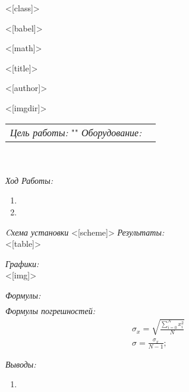
<[class]>
\usepackage[utf8]{inputenc}
<[babel]>
\usepackage[OT1]{fontenc}
<[math]>
\usepackage{graphicx}
\usepackage[left=2cm,right=2cm,top=2cm,bottom=2cm]{geometry}

<[title]>

<[author]>

<[imgdir]>

\maketitle

\begin{tabular}{p{12cm} l}
\textit{Цель работы:\newline} "" \newline \newline
\textit{Оборудование:\newline}  
\end{tabular}\\ \\

\textit{Ход Работы:}
\begin{enumerate}
  \item 
  \item 
\end{enumerate}

\textit{Cхема установки}
<[scheme]>
\textit{Результаты:\\}
<[table]>

\textit{Графики:\\}
<[img]>

\textit{Формулы:}
\begin{align*}

\end{align*}
\textit{Формулы погрешностей:}
\begin{align*}
  & \sigma_x = \sqrt{\frac{\sum\limits_{i=0}^{N}x_i^2}{N}} \\
  & \sigma = \frac{\sigma_x}{N-1};%
\end{align*}

\textit{Выводы:\\}
\begin{enumerate}
  \item 
\end{enumerate}

